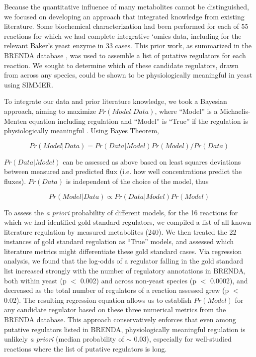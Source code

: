 Because the quantitative influence of many metabolites cannot be distinguished, we focused on developing an approach that integrated knowledge from existing literature. Some biochemical characterization had been performed for each of 55 reactions for which we had complete integrative `omics data, including for the relevant Baker's yeast enzyme in 33 cases. This prior work, as summarized in the BRENDA database \cite{Scheer:2011df}, was used to assemble a list of putative regulators for each reaction. We sought to determine which of these candidate regulators, drawn from across any species, could be shown to be physiologically meaningful in yeast using SIMMER.
 
To integrate our data and prior literature knowledge, we took a Bayesian approach, aiming to maximize $Pr(Model | Data)$, where ``Model'' is a Michaelis-Menten equation including regulation and ``Model'' is ``True'' if the regulation is physiologically meaningful \cite{Gelman:2003vk}. Using Bayes Theorem, 

\begin{equation}
Pr(Model | Data) = Pr(Data | Model) Pr(Model) / Pr(Data)\label{eqtn-bayes1}
\end{equation}

$Pr(Data | Model)$ can be assessed as above based on least squares deviations between measured and predicted flux (i.e. how well concentrations predict the fluxes). $Pr(Data)$ is independent of the choice of the model, thus 

\begin{equation}
Pr(Model | Data) \propto Pr(Data | Model) Pr(Model) \label{eqtn-bayes2}
\end{equation}

To assess the \textit{a priori} probability of different models, for the 16 reactions for which we had identified gold standard regulators, we compiled a list of all known literature regulation by measured metabolites (240). We then treated the 22 instances of gold standard regulation as ``True'' models, and assessed which literature metrics might differentiate these gold standard cases. Via regression analysis, we found that the log-odds of a regulator falling in the gold standard list increased strongly with the number of regulatory annotations in BRENDA, both within yeast (p $<$ 0.002) and across non-yeast species (p $<$ 0.0002), and decreased as the total number of regulators of a reaction assessed grew (p $<$ 0.02). The resulting regression equation allows us to establish $Pr(Model)$ for any candidate regulator based on these three numerical metrics from the BRENDA database. This approach conservatively enforces that even among putative regulators listed in BRENDA, physiologically meaningful regulation is unlikely \textit{a priori} (median probability of $\sim$ 0.03), especially for well-studied reactions where the list of putative regulators is long.  


